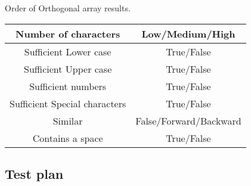 \documentclass[12pt,letterpaper]{article}
\begin{document}
\centering Order of Orthogonal array results.
\begin{center}  
  \begin{tabular}{||c|c||}
  \hline
  Number of characters & Low/Medium/High \\
  \hline
  Sufficient Lower case & True/False \\
  \hline
  Sufficient Upper case& True/False \\
  \hline
  Sufficient numbers & True/False \\
  \hline
  Sufficient Special characters & True/False \\
  \hline
  Similar & False/Forward/Backward \\
  \hline
  Contains a space & True/False \\
  \hline
  \end{tabular}
\end{center}


\subsection{Test plan}
\end{document}
